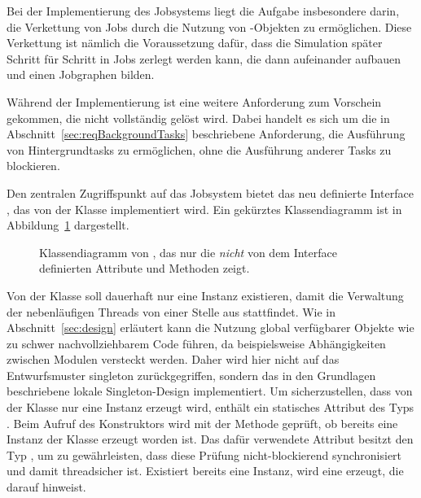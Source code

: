 Bei der Implementierung des Jobsystems liegt die Aufgabe insbesondere darin, die Verkettung von Jobs durch die Nutzung von \classCompletableFuture{}-Objekten zu ermöglichen. Diese Verkettung ist nämlich die Voraussetzung dafür, dass die Simulation später Schritt für Schritt in Jobs zerlegt werden kann, die dann aufeinander aufbauen und einen Jobgraphen bilden. 

Während der Implementierung ist eine weitere Anforderung zum Vorschein gekommen, die nicht vollständig gelöst wird. Dabei handelt es sich um die in Abschnitt~\vref{sec:reqBackgroundTasks} beschriebene Anforderung, die Ausführung von Hintergrundtasks zu ermöglichen, ohne die Ausführung anderer Tasks zu blockieren. 

Den zentralen Zugriffspunkt auf das Jobsystem bietet das neu definierte Interface \classBlocklibExecutorService{}, das von der Klasse \classBlocklibExecutor{} implementiert wird. Ein gekürztes Klassendiagramm ist in Abbildung~\ref{fig:diag-BlocklibExecutor} dargestellt.

\begin{figure}[!htb]
	\centering
	
	\caption[Gekürztes Klassendiagramm von \classBlocklibExecutor{}.]{Klassendiagramm von \classBlocklibExecutor{}, das nur die \emph{nicht} von dem Interface \classBlocklibExecutorService{} definierten Attribute und Methoden zeigt.}\label{fig:diag-BlocklibExecutor}
\end{figure}

Von der Klasse \classBlocklibExecutor{} soll dauerhaft nur eine Instanz existieren, damit die Verwaltung der nebenläufigen Threads von einer Stelle aus stattfindet. Wie in Abschnitt~\vref{sec:design} erläutert kann die Nutzung global verfügbarer Objekte wie \classContext{} zu schwer nachvollziehbarem Code führen, da beispielsweise Abhängigkeiten zwischen Modulen versteckt werden. Daher wird hier nicht auf das Entwurfsmuster \gls{singleton} zurückgegriffen, sondern das in den Grundlagen beschriebene lokale Singleton-Design implementiert. Um sicherzustellen, dass von der Klasse nur eine Instanz erzeugt wird, enthält \classBlocklibExecutor{} ein statisches Attribut  des Typs \classAtomicBoolean{}. Beim Aufruf des Konstruktors wird mit der Methode  geprüft, ob bereits eine Instanz der Klasse erzeugt worden ist. Das dafür verwendete Attribut  besitzt den Typ , um zu gewährleisten, dass diese Prüfung nicht-blockierend synchronisiert und damit threadsicher ist. Existiert bereits eine Instanz, wird eine \classUnsupportedOperationException{} erzeugt, die darauf hinweist.


